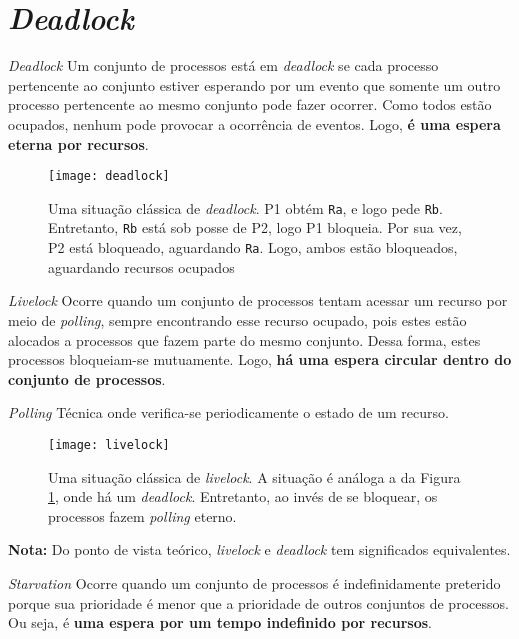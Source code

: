 \section{\textit{Deadlock}}
\begin{definicao}{\textit{Deadlock}}
  Um conjunto de processos está em \textit{deadlock} se cada processo pertencente ao conjunto estiver esperando por um evento que somente um outro processo pertencente ao mesmo conjunto pode fazer ocorrer. Como todos estão ocupados, nenhum pode provocar a ocorrência de eventos. Logo, \textbf{é uma espera eterna por recursos}.
\end{definicao}

\begin{figure}[ht]
  \centering
  \texttt{[image: deadlock]}
  \caption{Uma situação clássica de \textit{deadlock}. P1 obtém \texttt{Ra}, e logo pede \texttt{Rb}. Entretanto, \texttt{Rb} está sob posse de P2, logo P1 bloqueia. Por sua vez, P2 está bloqueado, aguardando \texttt{Ra}. Logo, ambos estão bloqueados, aguardando recursos ocupados}
  \label{fig:deadlock}
\end{figure}

\begin{definicao}{\textit{Livelock}}
  Ocorre quando um conjunto de processos tentam acessar um recurso por meio de \textit{polling}, sempre encontrando esse recurso ocupado, pois estes estão alocados a processos que fazem parte do mesmo conjunto. Dessa forma, estes processos bloqueiam-se mutuamente. Logo, \textbf{há uma espera circular dentro do conjunto de processos}.
\end{definicao}

\begin{definicao}{\textit{Polling}}
  Técnica onde verifica-se periodicamente o estado de um recurso.
\end{definicao}

\begin{figure}[ht]
  \centering
  \texttt{[image: livelock]}
  \caption{Uma situação clássica de \textit{livelock}. A situação é análoga a da Figura \ref{fig:deadlock}, onde há um \textit{deadlock}. Entretanto, ao invés de se bloquear, os processos fazem \textit{polling} eterno.}
  \label{fig:livelock}
\end{figure}

\textbf{Nota:} Do ponto de vista teórico, \textit{livelock} e \textit{deadlock} tem significados equivalentes.

\begin{definicao}{\textit{Starvation}}
  Ocorre quando um conjunto de processos é indefinidamente preterido porque sua prioridade é menor que a prioridade de outros conjuntos de processos. Ou seja, é \textbf{uma espera por um tempo indefinido por recursos}.
\end{definicao}










